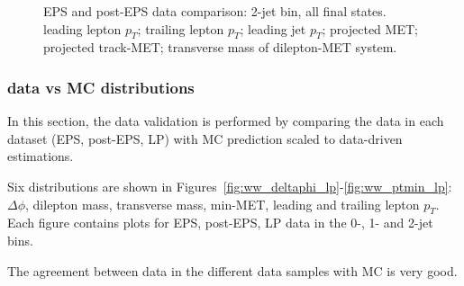 \begin{figure}[!hbtp]
\caption{EPS and post-EPS data comparison: 2-jet bin, all final states. 
 leading lepton $p_T$;
 trailing lepton $p_T$;
 leading jet $p_T$;
 projected MET;
 projected track-MET;
 transverse mass of dilepton-MET system.
}
\label{fig:lp_ww2j_lepjetmet}
\end{figure}

\clearpage

\subsubsection{data vs MC distributions}

In this section, the data validation is performed by comparing the data in each dataset (EPS, post-EPS, LP) with MC prediction scaled to 
data-driven estimations.

Six distributions are shown in Figures~\ref{fig:ww_deltaphi_lp}-\ref{fig:ww_ptmin_lp}: $\Delta\phi$, dilepton mass, transverse mass, 
min-MET, leading and trailing lepton $p_T$. Each figure contains plots for EPS, post-EPS, LP data in the 0-, 1- and 2-jet bins.

The agreement between data in the different data samples with MC is very good.

